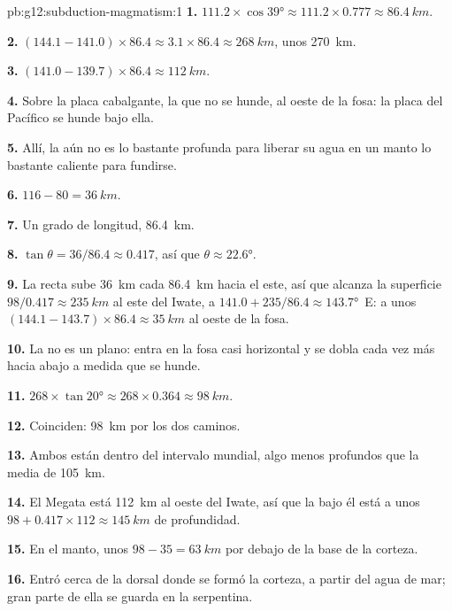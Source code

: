 \begin{solution}{pb:g12:subduction-magmatism:1}
\textbf{1.} $111.2 \times \cos\ang{39} \approx 111.2 \times 0.777 \approx
\qty{86.4}{km}$.

\textbf{2.} $(144.1 - 141.0) \times 86.4 \approx 3.1 \times 86.4 \approx
\qty{268}{km}$, unos \qty{270}{km}.

\textbf{3.} $(141.0 - 139.7) \times 86.4 \approx \qty{112}{km}$.

\textbf{4.} Sobre la placa cabalgante, la que no se hunde, al oeste de la
fosa: la placa del Pacífico se hunde bajo ella.

\textbf{5.} Allí, la  aún no es lo bastante profunda para liberar su agua
en un manto lo bastante caliente para fundirse.

\textbf{6.} $116 - 80 = \qty{36}{km}$.

\textbf{7.} Un grado de longitud, \qty{86.4}{km}.

\textbf{8.} $\tan\theta = 36/86.4 \approx 0.417$, así que $\theta \approx
\ang{22.6}$.

\textbf{9.} La recta sube \qty{36}{km} cada \qty{86.4}{km} hacia el este, así
que alcanza la superficie $98/0.417 \approx \qty{235}{km}$ al este del Iwate,
a $141.0 + 235/86.4 \approx \ang{143.7}$~E: a unos $(144.1 - 143.7) \times 86.4
\approx \qty{35}{km}$ al oeste de la fosa.

\textbf{10.} La  no es un plano: entra en la fosa casi horizontal y se
dobla cada vez más hacia abajo a medida que se hunde.

\textbf{11.} $268 \times \tan\ang{20} \approx 268 \times 0.364 \approx
\qty{98}{km}$.

\textbf{12.} Coinciden: \qty{98}{km} por los dos caminos.

\textbf{13.} Ambos están dentro del intervalo mundial, algo menos profundos
que la media de \qty{105}{km}.

\textbf{14.} El Megata está \qty{112}{km} al oeste del Iwate, así que la 
bajo él está a unos $98 + 0.417 \times 112 \approx \qty{145}{km}$ de profundidad.

\textbf{15.} En el manto, unos $98 - 35 = \qty{63}{km}$ por debajo de la base
de la corteza.

\textbf{16.} Entró cerca de la dorsal donde se formó la corteza, a partir del
agua de mar; gran parte de ella se guarda en la serpentina.


\end{solution}
